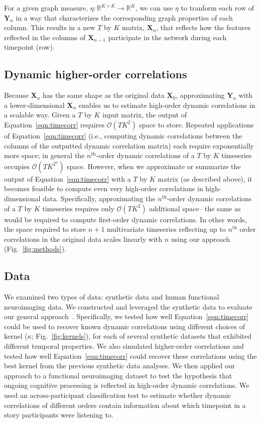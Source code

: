 \documentclass[english]{article}
\begin{document}
For a given graph measure,
$\eta: \mathbb{R}^{K \times K} \rightarrow \mathbb{R}^K$, we can use
$\eta$ to tranform each row of $\mathbf{Y}_n$ in a way that
characterizes the corresponding graph properties of each
column.  This results in a new $T$ by $K$ matrix, $\mathbf{X}_n$, that
reflects how the features reflected in the columns of $\mathbf{X}_{n-1}$
participate in the network during each timepoint (row).


\subsection*{Dynamic higher-order correlations}

Because $\mathbf{X}_n$ has the same shape as the original data
$\mathbf{X}_0$, approximating $\mathbf{Y}_n$ with a lower-dimensional
$\mathbf{X}_n$ enables us to estimate high-order dynamic correlations
in a scalable way.  Given a $T$ by $K$ input matrix, the output of
Equation~\ref{eqn:timecorr} requires $\mathcal{O}(TK^2)$ space to
store.  Repeated applications of Equation~\ref{eqn:timecorr} (i.e.,
computing dynamic correlations between the columns of the outputted
dynamic correlation matrix) each require exponentially more space; in
general the $n^\mathrm{th}$-order dynamic correlations of a $T$ by $K$
timeseries occupies $\mathcal{O}(TK^{2^n})$ space.  However, when we
approximate or summarize the output of Equation~\ref{eqn:timecorr} with a $T$ by
$K$ matrix (as described above), it becomes feasible to compute even
very high-order correlations in high-dimensional data.  Specifically,
approximating the $n^\mathrm{th}$-order dynamic correlations of a $T$
by $K$ timeseries requires only $\mathcal{O}(TK^2)$ additional space--
the same as would be required to compute first-order dynamic
correlations. In other words, the space required to store $n+1$
multivariate timeseries reflecting up to $n^\mathrm{th}$ order
correlations in the original data scales linearly with $n$ using our
approach (Fig.~\ref{fig:methods}).

\subsection*{Data}
We examined two types of data: synthetic data and human functional
neuroimaging data.  We constructed and leveraged the synthetic data to
evaluate our general approach~\citep[for a related validation approach
see][]{ThomEtal18}.  Specifically, we tested how well
Equation~\ref{eqn:timecorr} could be used to recover known dynamic
correlations using different choices of kernel ($\kappa$;
Fig.~\ref{fig:kernels}), for each of several synthetic datasets that
exhibited different temporal properties. We also simulated
higher-order correlations and tested how well
Equation~\ref{eqn:timecorr} could recover these correlations using the
best kernel from the previous synthetic data analyses.  We then applied our
approach to a functional neuroimaging dataset to test the hypothesis
that ongoing cognitive processing is reflected in high-order dynamic
correlations.  We used an across-participant classification test to
estimate whether dynamic correlations of different orders contain
information about which timepoint in a story participants were
listening to.
\end{document}
